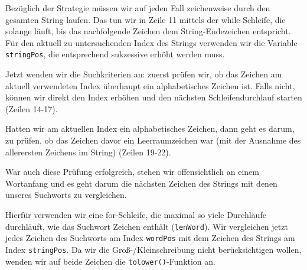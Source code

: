 Bezüglich der Strategie müssen wir auf jeden Fall zeichenweise durch den
gesamten String laufen. Das tun wir in Zeile 11 mittels der while-Schleife, die
solange läuft, bis das nachfolgende Zeichen dem String-Endezeichen entspricht.
Für den aktuell zu untersuchenden Index des Strings verwenden wir die Variable
\texttt{stringPos}, die entsprechend sukzessive erhöht werden muss.

Jetzt wenden wir die Suchkriterien an: zuerst prüfen wir, ob das Zeichen am
aktuell verwendeten Index überhaupt ein alphabetisches Zeichen ist. Falls nicht,
können wir direkt den Index erhöhen und den nächsten Schleifendurchlauf starten
(Zeilen 14-17).

Hatten wir am aktuellen Index ein alphabetisches Zeichen, dann geht es darum, zu
prüfen, ob das Zeichen davor ein Leerraumzeichen war (mit der Ausnahme des
allerersten Zeichens im String) (Zeilen 19-22).

War auch diese Prüfung erfolgreich, stehen wir offensichtlich an einem Wortanfang
und es geht darum die nächsten Zeichen des Strings mit denen unseres Suchworts
zu vergleichen.

Hierfür verwenden wir eine for-Schleife, die maximal so viele Durchläufe
durchläuft, wie das Suchwort Zeichen enthält (\texttt{lenWord}). Wir
vergleichen jetzt jedes Zeichen des Suchworts am Index \texttt{wordPos}
mit dem Zeichen des Strings am Index \texttt{stringPos}. Da wir die
Groß-/Kleinschreibung nicht berücksichtigen wollen, wenden wir auf beide Zeichen
die \texttt{tolower()}-Funktion an.

